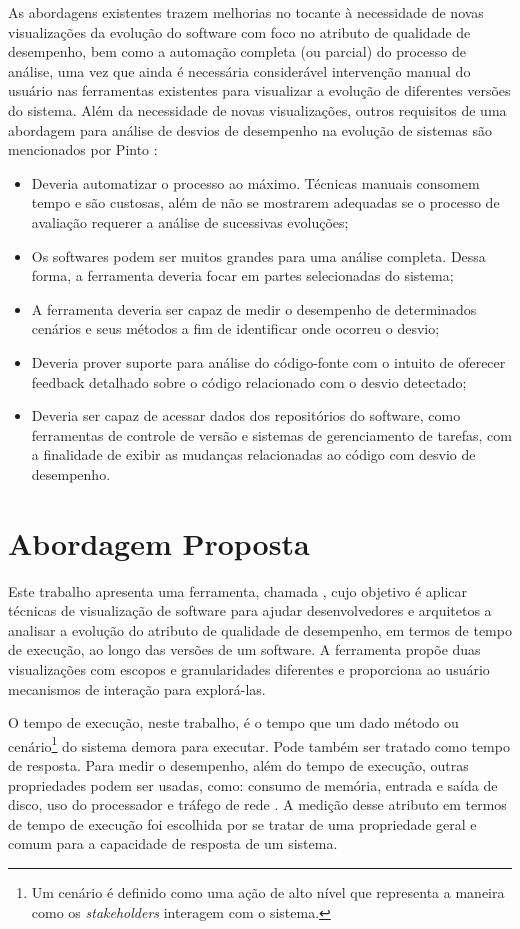 As abordagens existentes trazem melhorias no tocante à necessidade de novas visualizações da evolução do software com foco no atributo de qualidade de desempenho, bem como a automação completa (ou parcial) do processo de análise, uma vez que ainda é necessária considerável intervenção manual do usuário nas ferramentas existentes para visualizar a evolução de diferentes versões do sistema. Além da necessidade de novas visualizações, outros requisitos de uma abordagem para análise de desvios de desempenho na evolução de sistemas são mencionados por Pinto \cite{Pinto2015}:
\begin{itemize}
	\item Deveria automatizar o processo ao máximo. Técnicas manuais consomem tempo e são custosas, além de não se mostrarem adequadas se o processo de avaliação requerer a análise de sucessivas evoluções;
	\item Os softwares podem ser muitos grandes para uma análise completa. Dessa forma, a ferramenta deveria focar em partes selecionadas do sistema;
	\item A ferramenta deveria ser capaz de medir o desempenho de determinados cenários e seus métodos a fim de identificar onde ocorreu o desvio;
	\item Deveria prover suporte para análise do código-fonte com o intuito de oferecer feedback detalhado sobre o código relacionado com o desvio detectado;
	\item Deveria ser capaz de acessar dados dos repositórios do software, como ferramentas de controle de versão e sistemas de gerenciamento de tarefas, com a finalidade de exibir as mudanças relacionadas ao código com desvio de desempenho.
\end{itemize}

\section{Abordagem Proposta} \label{sec:abordagem-proposta}

Este trabalho apresenta uma ferramenta, chamada \textit{\toolName}, cujo objetivo é aplicar técnicas de visualização de software para ajudar desenvolvedores e arquitetos a analisar a evolução do atributo de qualidade de desempenho, em termos de tempo de execução, ao longo das versões de um software. A ferramenta propõe duas visualizações com escopos e granularidades diferentes e proporciona ao usuário mecanismos de interação para explorá-las.

O tempo de execução, neste trabalho, é o tempo que um dado método ou cenário\footnote{Um cenário é definido como uma ação de alto nível que representa a maneira como os \textit{stakeholders} interagem com o sistema.} do sistema demora para executar. Pode também ser tratado como tempo de resposta. Para medir o desempenho, além do tempo de execução, outras propriedades podem ser usadas, como: consumo de memória, entrada e saída de disco, uso do processador e tráfego de rede \cite{Malik2013}. A medição desse atributo em termos de tempo de execução foi escolhida por se tratar de uma propriedade geral e comum para a capacidade de resposta de um sistema.

